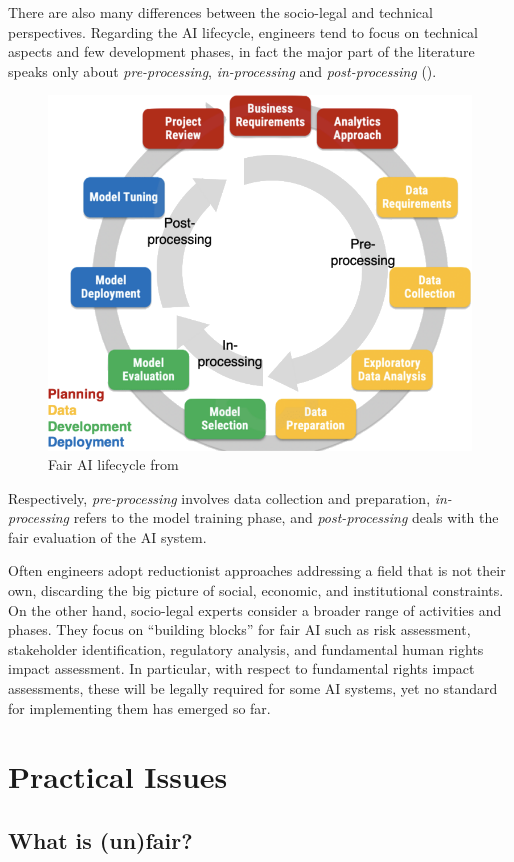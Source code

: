 \documentclass[12pt,a4paper,openright,twoside]{book}
\begin{document}
There are also many differences between the socio-legal and technical perspectives. Regarding the \ac{AI} lifecycle, engineers tend to focus on technical aspects and few development phases, in fact the major part of the literature speaks only about \textit{pre-processing}, \textit{in-processing} and \textit{post-processing} ().
%
\begin{figure}
    \centering
    \includegraphics[width=.6\linewidth]{figures/ai-lifecycle.png}
    \caption{Fair \acs{AI} lifecycle from \cite{DBLP:conf/ijcai/CalegariCMO23}}
    \label{fig:ai-lifecycle}
\end{figure}
%
Respectively, \textit{pre-processing} involves data collection and preparation, \textit{in-processing} refers to the model training phase, and \textit{post-processing} deals with the fair evaluation of the \ac{AI} system.

Often engineers adopt reductionist approaches addressing a field that is not their own, discarding the big picture of social, economic, and institutional constraints.
%
On the other hand, socio-legal experts consider a broader range of activities and phases. They focus on ``building blocks'' for fair \ac{AI} such as risk assessment, stakeholder identification, regulatory analysis, and fundamental human rights impact assessment. In particular, with respect to fundamental rights impact assessments, these will be legally required for some \ac{AI} systems, yet no standard for implementing them has emerged so far.




\section{Practical Issues}

\subsection{What is (un)fair?}
\end{document}
